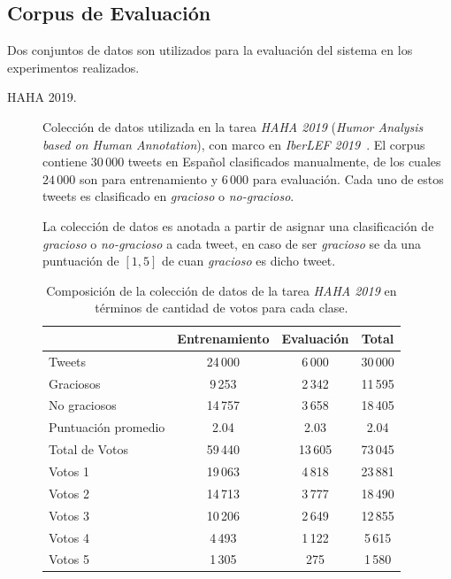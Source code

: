 \subsection{Corpus de Evaluación}\label{section:evaluation-corpus}

Dos conjuntos de datos son utilizados para la evaluación del sistema en los experimentos realizados.

\begin{description}

\item[HAHA 2019.]
Colección de datos utilizada en la tarea \emph{HAHA 2019} (\emph{Humor Analysis based on Human Annotation}), con marco en \emph{IberLEF 2019}~\parencite{chiruzzo2019overview}.
El corpus contiene $30\,000$ tweets en Español clasificados manualmente, de los cuales $24\,000$ son para entrenamiento y $6\,000$ para evaluación.
Cada uno de estos tweets es clasificado en \emph{gracioso} o \emph{no-gracioso}.

La colección de datos es anotada a partir de asignar una clasificación de \emph{gracioso} o \emph{no-gracioso} a cada tweet, en caso de ser \emph{gracioso} se da una puntuación de $[1,5]$ de cuan \emph{gracioso} es dicho tweet.

\begin{table}[H]
    \centering
    \begin{tabular}{lccc}
    \toprule
                            & Entrenamiento & Evaluación & Total   \\\midrule
        Tweets              & 24\,000       & 6\,000     & 30\,000 \\
        Graciosos           & 9\,253        & 2\,342     & 11\,595 \\
        No graciosos        & 14\,757       & 3\,658     & 18\,405 \\
        Puntuación promedio & 2.04          & 2.03       & 2.04    \\\midrule
        Total de Votos      & 59\,440       & 13\,605    & 73\,045 \\
        Votos 1             & 19\,063       & 4\,818     & 23\,881 \\
        Votos 2             & 14\,713       & 3\,777     & 18\,490 \\
        Votos 3             & 10\,206       & 2\,649     & 12\,855 \\
        Votos 4             &  4\,493       & 1\,122     &  5\,615 \\
        Votos 5             &  1\,305       &    275     &  1\,580 \\
    \bottomrule
    \end{tabular}
    \caption{Composición de la colección de datos de la tarea \emph{HAHA 2019} en términos de cantidad de votos para cada clase.}
    \label{table:haha2019info}
\end{table}


\end{description}
